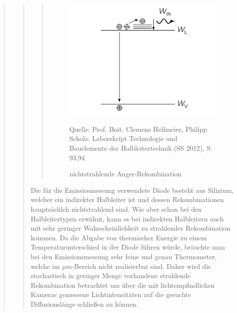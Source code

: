 \begin{quote}
\begin{quote}
\begin{quote}
            \begin{figure}[H]
                    \centering
                        \includegraphics[scale=0.78, trim = 1cm 0cm 1.5cm 0cm,
                        clip]{./Emissionsbilder/restliches/auger.png}
                        \caption{nichtstrahlende Auger-Rekombination}
                                \begin{center}
                                    \small Quelle: Prof. Boit, Clemens Helfmeier, Philipp Scholz: Laborskript Technologie und Bauelemente der Halbleitertechnik (SS 2012), S. 93,94
                                \end{center}
                            \label{fig:./Emissionsbilder/restliches/auger.png}
            \end{figure}

            \end{quote}

        Die für die Emissiosmessung verwendete Diode besteht aus Silizium,
        welcher ein indirekter Halbleiter ist und dessen Rekombinationen
        hauptsächlch nichtstrahlend sind. Wie aber schon bei den Halbleitertypen
        erwähnt, kann es bei indirekten Halbleitern auch mit sehr geringer
        Wahrscheinlichkeit zu strahlender Rekombination kommen. Da die Abgabe
        von thermischer Energie zu einem Temperaturunterschied in der Diode
        führen würde, bräuchte man bei den Emissionsmessung sehr feine und genau
        Thermometer, welche im $\mu m$-Bereich nicht realisierbar sind. Daher
        wird die stochastisch in geringer Menge vorhandene strahlende
        Rekombination betrachtet um über die mit lichtempfindlichen
        Kameras gemessene Lichtintensitäten auf die gesuchte Diffusionslänge
        schließen zu können.

        \end{quote}


\end{quote}
